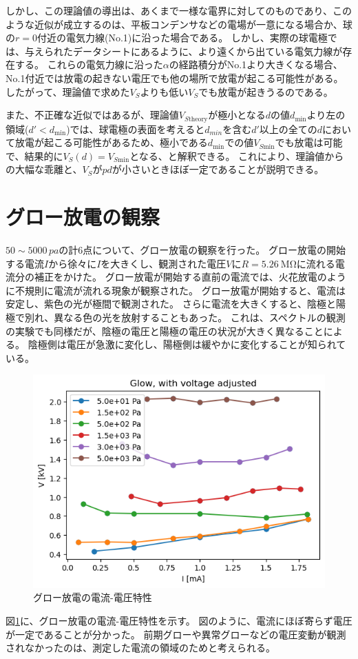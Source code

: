 \documentclass[a4paper]{ltjsarticle}
\begin{document}
しかし、この理論値の導出は、あくまで一様な電界に対してのものであり、このような近似が成立するのは、平板コンデンサなどの電場が一意になる場合か、球の$r=0$付近の電気力線(No.1)に沿った場合である。
しかし、実際の球電極では、与えられたデータシートにあるように、より遠くから出ている電気力線が存在する。
これらの電気力線に沿った$\alpha$の経路積分がNo.1より大きくなる場合、No.1付近では放電の起きない電圧でも他の場所で放電が起こる可能性がある。
したがって、理論値で求めた$V_S$よりも低い$V_S$でも放電が起きうるのである。

また、不正確な近似ではあるが、理論値$V_{S\text{theory}}$が極小となる$d$の値$d_{\text{min}}$より左の領域($d'<d_{\text{min}}$)では、球電極の表面を考えると$d_{min}$を含む$d'$以上の全ての$d$において放電が起こる可能性があるため、極小である$d_{\text{min}}$での値$V_{S\text{min}}$でも放電は可能で、結果的に$V_S(d) = V_{S\text{min}}$となる、と解釈できる。
これにより、理論値からの大幅な乖離と、$V_S$が$pd$が小さいときほぼ一定であることが説明できる。

\section{グロー放電の観察}
$50\sim5000\,\si{pa}$の計6点について、グロー放電の観察を行った。
グロー放電の開始する電流$I$から徐々に$I$を大きくし、観測された電圧$V$に$R=\SI{5.26}{\mega\ohm}$に流れる電流分の補正をかけた。
グロー放電が開始する直前の電流では、火花放電のように不規則に電流が流れる現象が観察された。
グロー放電が開始すると、電流は安定し、紫色の光が極間で観測された。
さらに電流を大きくすると、陰極と陽極で別れ、異なる色の光を放射することもあった。
これは、スペクトルの観測の実験でも同様だが、陰極の電圧と陽極の電圧の状況が大きく異なることによる。
陰極側は電圧が急激に変化し、陽極側は緩やかに変化することが知られている。

\begin{figure}
    \centering
    \includegraphics[width=0.7\linewidth]{./images/glow.png}
    \caption{グロー放電の電流-電圧特性}
    \label{fig:glow}
\end{figure}
図\ref{fig:glow}に、グロー放電の電流-電圧特性を示す。
図のように、電流にほぼ寄らず電圧が一定であることが分かった。
前期グローや異常グローなどの電圧変動が観測されなかったのは、測定した電流の領域のためと考えられる。
\end{document}
